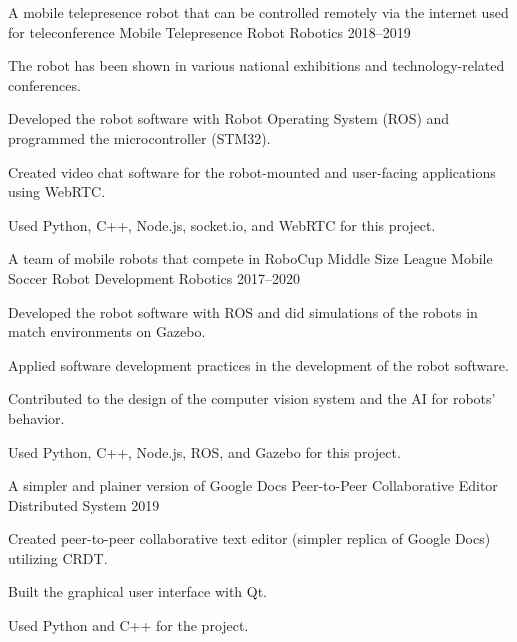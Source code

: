 

\begin{cventries}
	\cventry
	{A mobile telepresence robot that can be controlled remotely via the internet used for teleconference} %
	{Mobile Telepresence Robot} %
	{Robotics} %
	{2018--2019} %
	{
		\begin{cvitems} %
			\item {The robot has been shown in various national exhibitions and technology-related conferences.}
			\item {Developed the robot software with Robot Operating System (ROS) and programmed the microcontroller (STM32).}
			\item {Created video chat software for the robot-mounted and user-facing applications using WebRTC.}
			\item {Used Python, C++, Node.js, socket.io, and WebRTC for this project.}
		\end{cvitems}
	}
    
    \cventry
    {A team of mobile robots that compete in RoboCup Middle Size League} %
    {Mobile Soccer Robot Development} %
    {Robotics} %
    {2017--2020} %
    {
    	\begin{cvitems} %
    		\item {Developed the robot software with ROS and did simulations of the robots in match environments on Gazebo.}
    		\item {Applied software development practices in the development of the robot software.}
    		\item {Contributed to the design of the computer vision system and the AI for robots' behavior.}
    		\item {Used Python, C++, Node.js, ROS, and Gazebo for this project.}
    	\end{cvitems}
    }
    
    \cventry
    {A simpler and plainer version of Google Docs} %
    {Peer-to-Peer Collaborative Editor} %
    {Distributed System} %
    {2019} %
    {
    	\begin{cvitems} %
    		\item {Created peer-to-peer collaborative text editor (simpler replica of Google Docs) utilizing CRDT.}
    		\item {Built the graphical user interface with Qt.}
    		\item {Used Python and C++ for the project.}
    	\end{cvitems}
    }
    

\end{cventries}
